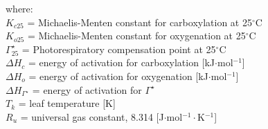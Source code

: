 \noindent where:\\
\indent $K_{c25}$ = Michaelis-Menten constant for carboxylation at 25$^{\circ}$C\\
\indent $K_{o25}$ = Michaelis-Menten constant for oxygenation at 25$^{\circ}$C\\
\indent $\Gamma^{\star}_{25}$ = Photorespiratory compensation point at 25$^{\circ}$C\\
\indent $\Delta H_c$ = energy of activation for carboxylation [kJ$\cdot$mol$^{-1}$]\\
\indent $\Delta H_o$ = energy of activation for oxygenation [kJ$\cdot$mol$^{-1}$]\\
\indent $\Delta H_{\Gamma^{\star}}$ = energy of activation for $\Gamma^{\star}$\\
\indent $T_k$ = leaf temperature [K]\\
\indent $R_{u}$ = universal gas constant, 8.314 [J$\cdot$mol$^{-1}\cdot$K$^{-1}$]\\

